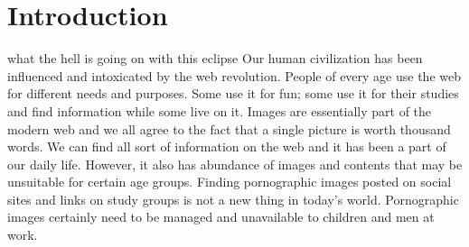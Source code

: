 \chapter{Introduction}

\setcounter{page}{1}
 \thispagestyle{myheadings}

what the hell is going on with this eclipse
Our human civilization has been influenced and intoxicated by the web revolution. People of every age use the web for different needs and purposes. Some use it for fun; some use it for their studies and find information while some live on it. Images are essentially part of the modern web and we all agree to the fact that a single picture is worth thousand words. We can find all sort of information on the web and it has been a part of our daily life. However, it also has abundance of images and contents that may be unsuitable for certain age groups. Finding pornographic images posted on social sites and links on study groups is not a new thing in today’s world. Pornographic images certainly need to be managed and unavailable to children and men at work.  

%
